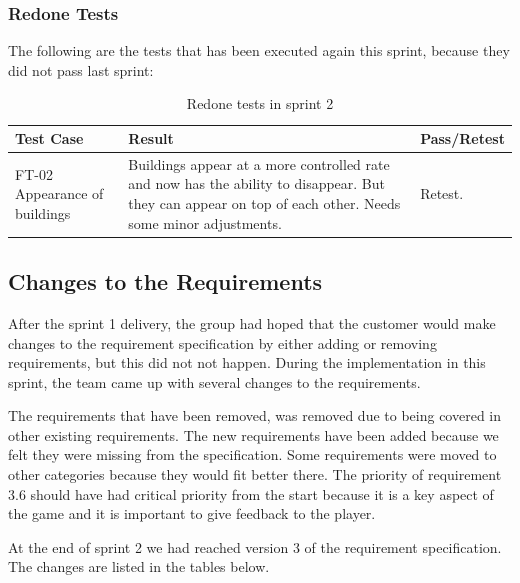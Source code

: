 	\subsubsection{Redone Tests}

	The following are the tests that has been executed again this sprint, because they did not pass last sprint:

	\begin{table}
	\begin{tabular}{| p{3cm} | p{6.5cm} | p{2.5cm} |}
		\hline
		\rowcolor{lightgray}
		{\bf Test Case} & {\bf Result} & {\bf Pass/Retest} \\ \hline

		FT-02 Appearance of buildings & Buildings appear at a more controlled rate and now has the ability to disappear. But they can appear on top of each other. Needs some minor adjustments. & Retest. \\ \hline

	\end{tabular}
	\caption{Redone tests in sprint 2}
	\end{table}

\subsection{Changes to the Requirements}
	
	After the sprint 1 delivery, the group had hoped that the customer would make 
	changes to the requirement specification by either adding or removing requirements, 
	but this did not not happen. During the implementation in this sprint, the 
	team came up with several changes to the requirements.

	The requirements that have been removed, was removed due to being covered in other 
	existing requirements. The new requirements have been added because we felt they were 
	missing from the specification. Some requirements were moved to other categories because 
	they would fit better there. The priority of requirement 3.6 should have had critical priority 
	from the start because it is a key aspect of the game and it is important to give feedback to the player.

	At the end of sprint 2 we had reached version 3 of the requirement specification. The changes are listed in the tables below.

